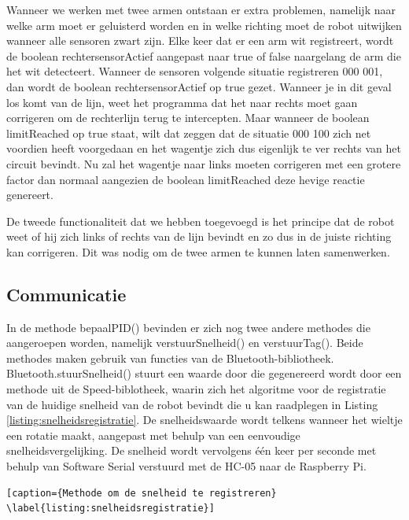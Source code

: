 Wanneer we werken met twee armen ontstaan er extra problemen, namelijk naar welke arm moet er geluisterd worden en in welke richting moet de robot uitwijken wanneer alle sensoren zwart zijn. Elke keer dat er een arm wit registreert, wordt de boolean rechtersensorActief aangepast naar true of false naargelang de arm die het wit detecteert. Wanneer de sensoren volgende situatie registreren 000 001, dan wordt de boolean rechtersensorActief op true gezet. Wanneer je in dit geval los komt van de lijn, weet het programma dat het naar rechts moet gaan corrigeren om de rechterlijn terug te intercepten. Maar wanneer de boolean limitReached op true staat, wilt dat zeggen dat de situatie 000 100 zich net voordien heeft voorgedaan en het wagentje zich dus eigenlijk te ver rechts van het circuit bevindt. Nu zal het wagentje naar links moeten corrigeren met een grotere factor dan normaal aangezien de boolean limitReached deze hevige reactie genereert.


De tweede functionaliteit dat we hebben toegevoegd is het principe dat de robot weet of hij zich links of rechts van de lijn bevindt en zo dus in de juiste richting kan corrigeren. Dit was nodig om de twee armen te kunnen laten samenwerken.


\subsection {Communicatie}

In de methode bepaalPID() bevinden er zich nog twee andere methodes die aangeroepen worden, namelijk verstuurSnelheid() en verstuurTag(). Beide methodes maken gebruik van functies van de Bluetooth-bibliotheek. Bluetooth.stuurSnelheid() stuurt een waarde door die gegenereerd wordt door een methode uit de Speed-biblotheek, waarin zich het algoritme voor de registratie van de huidige snelheid van de robot bevindt die u kan raadplegen in Listing \ref{listing:snelheidsregistratie}. De snelheidswaarde wordt telkens wanneer het wieltje een rotatie maakt, aangepast met behulp van een eenvoudige snelheidsvergelijking. De snelheid wordt vervolgens \'e\'en keer per seconde met behulp van Software Serial verstuurd met de HC-05 naar de Raspberry Pi. 


\begin{lstlisting}[caption={Methode om de snelheid te registreren} \label{listing:snelheidsregistratie}]
\end{lstlisting}

